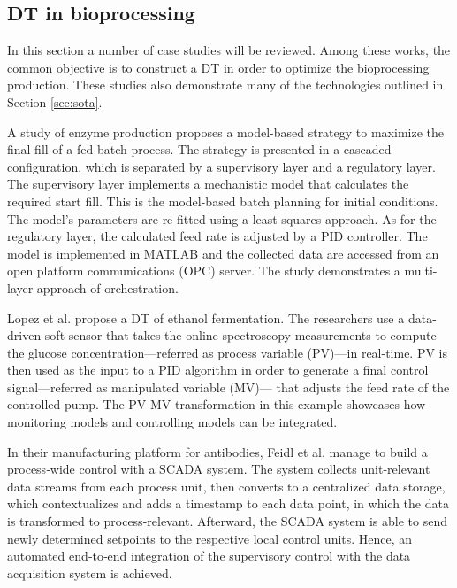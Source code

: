\documentclass[journal,onecolumn]{IEEEtran} %
\begin{document}
\subsection{DT in bioprocessing}
In this section a number of case studies will be reviewed. Among these works, the common objective is to construct a DT in order to optimize the bioprocessing production. These studies also demonstrate many of the technologies outlined in Section \ref{sec:sota}.

A study of enzyme production \cite{Mears2017} proposes a model-based strategy to maximize the final fill of a fed-batch process. The strategy is presented in a cascaded configuration, which is separated by a supervisory layer and a regulatory layer. The supervisory layer implements a mechanistic model that calculates the required start fill. This is the model-based batch planning for initial conditions. The model's parameters are re-fitted using a least squares approach. As for the regulatory layer, the calculated feed rate is adjusted by a PID controller. The model is implemented in MATLAB and the collected data are accessed from an open platform communications (OPC) server. The study demonstrates a multi-layer approach of orchestration. 

Lopez et al. \cite{Lopez2020} propose a DT of ethanol fermentation. The researchers use a data-driven soft sensor that takes the online spectroscopy measurements to compute the glucose  concentration---referred as process variable (PV)---in real-time. PV is then used as the input to a PID algorithm in order to generate a final control signal---referred as manipulated variable (MV)--- that adjusts the feed rate of the controlled pump. The PV-MV transformation in this example showcases how monitoring models and controlling models can be integrated.

In their manufacturing platform for antibodies, Feidl et al. \cite{Feidl2020} manage to build a process‐wide control with a SCADA system. The system collects unit-relevant data streams from each process unit, then converts to a centralized data storage, which contextualizes and adds a timestamp to each data point, in which the data is transformed to process-relevant. Afterward, the SCADA system is able to send newly determined setpoints to the respective local control units. Hence, an automated end‐to‐end integration of the supervisory control with the data acquisition system is achieved. 
\end{document}
